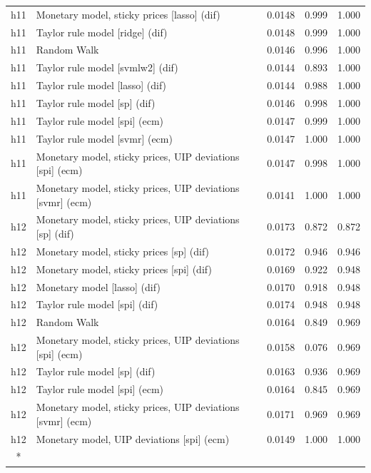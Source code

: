 \begin{ThreePartTable}
\begin{longtable}[t]{cp{5.5cm}ccc}
h11 & \raggedright Monetary model, sticky prices [lasso] (dif) & 0.0148 & 0.999 & 1.000\\
h11 & \raggedright Taylor rule model [ridge] (dif) & 0.0148 & 0.999 & 1.000\\
h11 & \raggedright Random Walk & 0.0146 & 0.996 & 1.000\\
h11 & \raggedright Taylor rule model [svmlw2] (dif) & 0.0144 & 0.893 & 1.000\\
h11 & \raggedright Taylor rule model [lasso] (dif) & 0.0144 & 0.988 & 1.000\\
h11 & \raggedright Taylor rule model [sp] (dif) & 0.0146 & 0.998 & 1.000\\
h11 & \raggedright Taylor rule model [spi] (ecm) & 0.0147 & 0.999 & 1.000\\
h11 & \raggedright Taylor rule model [svmr] (ecm) & 0.0147 & 1.000 & 1.000\\
h11 & \raggedright Monetary model, sticky prices, UIP deviations [spi] (ecm) & 0.0147 & 0.998 & 1.000\\
h11 & \raggedright Monetary model, sticky prices, UIP deviations [svmr] (ecm) & 0.0141 & 1.000 & 1.000\\
\addlinespace
h12 & \raggedright Monetary model, sticky prices, UIP deviations [sp] (dif) & 0.0173 & 0.872 & 0.872\\
h12 & \raggedright Monetary model, sticky prices [sp] (dif) & 0.0172 & 0.946 & 0.946\\
h12 & \raggedright Monetary model, sticky prices [spi] (dif) & 0.0169 & 0.922 & 0.948\\
h12 & \raggedright Monetary model [lasso] (dif) & 0.0170 & 0.918 & 0.948\\
h12 & \raggedright Taylor rule model [spi] (dif) & 0.0174 & 0.948 & 0.948\\
h12 & \raggedright Random Walk & 0.0164 & 0.849 & 0.969\\
h12 & \raggedright Monetary model, sticky prices, UIP deviations [spi] (ecm) & 0.0158 & 0.076 & 0.969\\
h12 & \raggedright Taylor rule model [sp] (dif) & 0.0163 & 0.936 & 0.969\\
h12 & \raggedright Taylor rule model [spi] (ecm) & 0.0164 & 0.845 & 0.969\\
h12 & \raggedright Monetary model, sticky prices, UIP deviations [svmr] (ecm) & 0.0171 & 0.969 & 0.969\\
h12 & \raggedright Monetary model, UIP deviations [spi] (ecm) & 0.0149 & 1.000 & 1.000\\*
\end{longtable}
\end{ThreePartTable}
\endgroup{}
